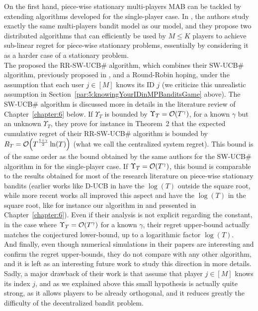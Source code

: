On the first hand, piece-wise stationary multi-players MAB can be tackled by extending algorithms developed for the single-player case.
In \cite{WeiSrivastava18Distributed}, the authors study exactly the same multi-players bandit model as our model, and they propose two distributed algorithms that can efficiently be used by $M \leq K$ players to achieve sub-linear regret for piece-wise stationary problems, essentially by considering it as a harder case of a stationary problem. \\
\indent
The proposed the RR-SW-UCB\# algorithm, which combines their SW-UCB\# algorithm, previously proposed in \cite{WeiSrivastava18Abruptly}, and a Round-Robin hoping, under the assumption that each user $j\in[M]$ knows its ID $j$ (we criticize this unrealistic assumption in Section~\ref{par:5:knowingYourIDinMPBanditsGame} above).
The SW-UCB\# algorithm is discussed more in details in the literature review of Chapter~\ref{chapter:6} below.
%
If $\Upsilon_T$ is bounded by $\Upsilon_T = \mathop{}\mathopen{}\mathcal{O}\mathopen{}\left(T^{\gamma}\right)$, for a known $\gamma$ but an unknown $\Upsilon_T$, they prove for instance in Theorem~2 \cite{WeiSrivastava18Distributed} that the expected cumulative regret of their RR-SW-UCB\# algorithm is bounded by $R_T = \mathop{}\mathopen{}\mathcal{O}\mathopen{}\left(T^{\frac{1+\gamma}{2}} \ln(T)\right)$ (what we call the centralized system regret).
This bound is of the same order as the bound obtained by the same authors for the SW-UCB\# algorithm in \cite{WeiSrivastava18Abruptly} for the single-player case.
If $\Upsilon_T = \mathop{}\mathopen{}\mathcal{O}\mathopen{}\left(T^{\gamma}\right)$, this bound is comparable to the results obtained for most of the research literature on piece-wise stationary bandits (earlier works like D-UCB in \cite{Garivier11UCBDiscount} have the $\log(T)$ outside the square root, while more recent works all improved this aspect and have the $\log(T)$ in the square root, like for instance our algorithm \GLRklUCB{} in \cite{Besson2019GLRT} and presented in Chapter~\ref{chapter:6}).
Even if their analysis is not explicit regarding the constant, in the case where $\Upsilon_T = \mathop{}\mathopen{}\mathcal{O}\mathopen{}\left(T^{\gamma}\right)$ for a known $\gamma$, their regret upper-bound actually matches the conjectured lower-bound, up to a logarithmic factor $\log(T)$. \\
%
\indent
And finally, even though numerical simulations in their papers \cite{WeiSrivastava18Abruptly,WeiSrivastava18Distributed} are interesting and confirm the regret upper-bounds, they do not compare with any other algorithm, and it is left as an interesting future work to study this direction in more details.
Sadly, a major drawback of their work is that assume that player $j\in[M]$ knows its index $j$, and as we explained above this small hypothesis is actually quite strong, as it allows players to be already orthogonal, and it reduces greatly the difficulty of the decentralized bandit problem.

